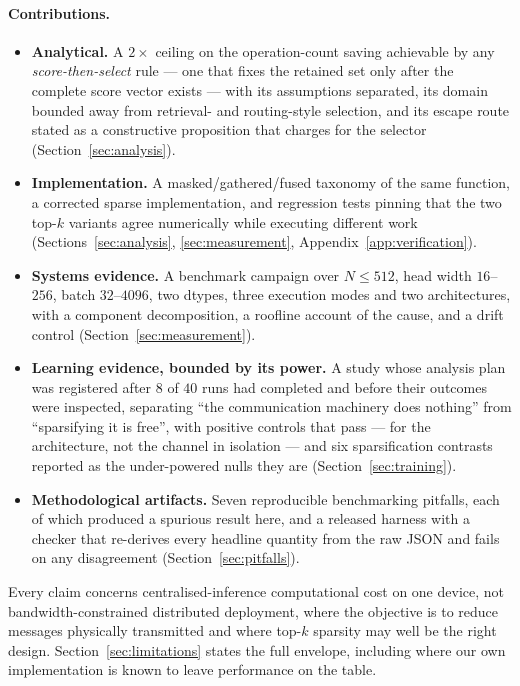 \paragraph{Contributions.}
\begin{itemize}
  \item \textbf{Analytical.} A $2\times$ ceiling on the operation-count saving
    achievable by any \emph{score-then-select} rule --- one that fixes the
    retained set only after the complete score vector exists --- with its
    assumptions separated, its domain bounded away from retrieval- and
    routing-style selection, and its escape route stated as a constructive
    proposition that charges for the selector (Section~\ref{sec:analysis}).
  \item \textbf{Implementation.} A masked/gathered/fused taxonomy of the same
    function, a corrected sparse implementation, and regression tests pinning
    that the two top-$k$ variants agree numerically while executing different
    work (Sections~\ref{sec:analysis}, \ref{sec:measurement},
    Appendix~\ref{app:verification}).
  \item \textbf{Systems evidence.} A benchmark campaign over $N \le 512$, head
    width $16$--$256$, batch $32$--$4096$, two dtypes, three execution modes
    and two architectures, with a component decomposition, a roofline account
    of the cause, and a drift control (Section~\ref{sec:measurement}).
  \item \textbf{Learning evidence, bounded by its power.} A study whose
    analysis plan was registered after $8$ of $40$ runs had completed and
    before their outcomes were inspected, separating ``the communication
    machinery does nothing'' from ``sparsifying it is free'', with positive
    controls that pass --- for the architecture, not the channel in isolation
    --- and six sparsification contrasts reported as the under-powered nulls
    they are (Section~\ref{sec:training}).
  \item \textbf{Methodological artifacts.} Seven reproducible benchmarking
    pitfalls, each of which produced a spurious result here, and a released
    harness with a checker that re-derives every headline quantity from the raw
    JSON and fails on any disagreement (Section~\ref{sec:pitfalls}).
\end{itemize}

Every claim concerns centralised-inference computational cost on one device,
not bandwidth-constrained distributed deployment, where the objective is to
reduce messages physically transmitted and where top-$k$ sparsity may well be
the right design. Section~\ref{sec:limitations} states the full envelope,
including where our own implementation is known to leave performance on the
table.
